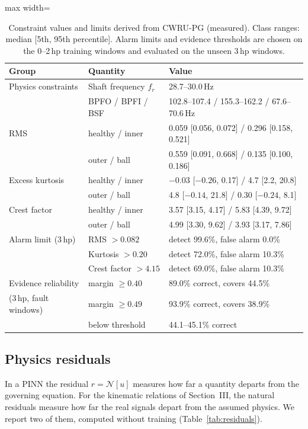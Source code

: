 \documentclass[conference]{IEEEtran}
\begin{document}
\begin{table}[t]
\caption{Constraint values and limits derived from CWRU-PG (measured). Class
ranges: median [5th, 95th percentile]. Alarm limits and evidence thresholds
are chosen on the 0--2\,hp training windows and evaluated on the unseen 3\,hp
windows.}
\label{tab:limits}
\centering
\footnotesize
\begin{adjustbox}{max width=\columnwidth}
\begin{tabular}{lll}
\toprule
Group & Quantity & Value \\
\midrule
Physics constraints & Shaft frequency $f_r$ & 28.7--30.0\,Hz \\
 & BPFO / BPFI / BSF & 102.8--107.4 / 155.3--162.2 / 67.6--70.6\,Hz \\
\midrule
RMS & healthy / inner & 0.059 [0.056, 0.072] / 0.296 [0.158, 0.521] \\
 & outer / ball & 0.559 [0.091, 0.668] / 0.135 [0.100, 0.186] \\
Excess kurtosis & healthy / inner & $-0.03$ [$-0.26$, 0.17] / 4.7 [2.2, 20.8] \\
 & outer / ball & 4.8 [$-0.14$, 21.8] / 0.30 [$-0.24$, 8.1] \\
Crest factor & healthy / inner & 3.57 [3.15, 4.17] / 5.83 [4.39, 9.72] \\
 & outer / ball & 4.99 [3.30, 9.62] / 3.93 [3.17, 7.86] \\
\midrule
Alarm limit (3\,hp) & RMS $>0.082$ & detect 99.6\%, false alarm 0.0\% \\
 & Kurtosis $>0.20$ & detect 72.0\%, false alarm 10.3\% \\
 & Crest factor $>4.15$ & detect 69.0\%, false alarm 10.3\% \\
\midrule
Evidence reliability & margin $\ge0.40$ & 89.0\% correct, covers 44.5\% \\
(3\,hp, fault windows) & margin $\ge0.49$ & 93.9\% correct, covers 38.9\% \\
 & below threshold & 44.1--45.1\% correct \\
\bottomrule
\end{tabular}
\end{adjustbox}
\end{table}

\subsection{Physics residuals}
\label{sec:residuals}
In a PINN the residual $r=\mathcal N[u]$ measures how far a quantity departs
from the governing equation. For the kinematic relations of Section~III, the
natural residuals measure how far the real signals depart from the assumed
physics. We report two of them, computed without training
(Table~\ref{tab:residuals}).
\end{document}
